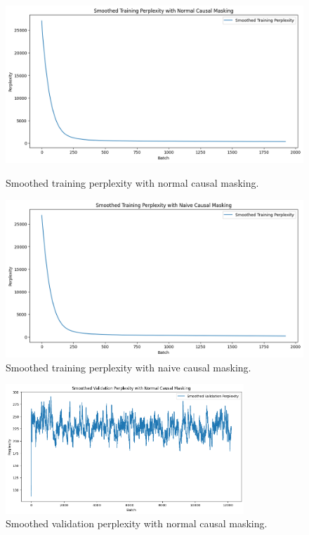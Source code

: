 \documentclass{article}
\begin{document}
\begin{figure}[htbp]
    \centering
    \begin{minipage}[b]{0.45\textwidth}
        \centering
        \includegraphics[width=\textwidth]{plots/trainingpplnormal98.png}
        \caption{Smoothed training perplexity with normal causal masking.}
        \label{fig:trainingpplnormal}
    \end{minipage}
    \hfill
    \begin{minipage}[b]{0.45\textwidth}
        \centering
        \includegraphics[width=\textwidth]{plots/trainingpplnaive98.png}
        \caption{Smoothed training perplexity with naive causal masking.}
        \label{fig:trainingpplnaive}
    \end{minipage}
\end{figure}

\begin{figure}[htbp]
    \centering
    \includegraphics[width=0.8\textwidth]{plots/validationpplnormal98.png}
    \caption{Smoothed validation perplexity with normal causal masking.}
    \label{fig:validationpplnormal}
\end{figure}
\end{document}
